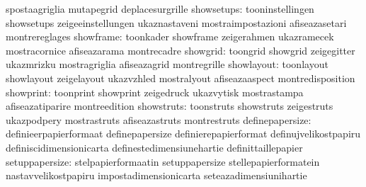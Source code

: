                                   spostaagriglia                   mutapegrid
                                  deplacesurgrille
                      showsetups: tooninstellingen                 showsetups
                                  zeigeeinstellungen               ukaznastaveni
                                  mostraimpostazioni               afiseazasetari
                                  montrereglages
                       showframe: toonkader                        showframe
                                  zeigerahmen                      ukazramecek
                                  mostracornice                    afiseazarama
                                  montrecadre
                        showgrid: toongrid                         showgrid
                                  zeigegitter                      ukazmrizku
                                  mostragriglia                    afiseazagrid
                                  montregrille
                      showlayout: toonlayout                       showlayout
                                  zeigelayout                      ukazvzhled
                                  mostralyout                      afiseazaaspect
                                  montredisposition
                       showprint: toonprint                        showprint
                                  zeigedruck                       ukazvytisk
                                  mostrastampa                     afiseazatiparire
                                  montreedition
                      showstruts: toonstruts                       showstruts
                                  zeigestruts                      ukazpodpery
                                  mostrastruts                     afiseazastruts
                                  montrestruts
                 definepapersize: definieerpapierformaat           definepapersize
                                  definierepapierformat            definujvelikostpapiru
                                  definiscidimensionicarta         definestedimensiunehartie
                                  definittaillepapier
                  setuppapersize: stelpapierformaatin              setuppapersize
                                  stellepapierformatein            nastavvelikostpapiru
                                  impostadimensionicarta           seteazadimensiunihartie
